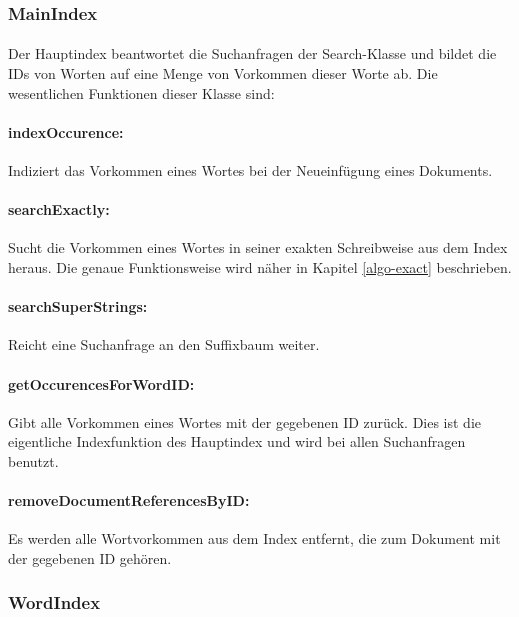 \subsubsection{MainIndex}
\label{arch-mainIndex}

\paragraph{} Der Hauptindex beantwortet die Suchanfragen der Search-Klasse und bildet die IDs von Worten auf eine Menge von Vorkommen dieser Worte ab. Die wesentlichen Funktionen dieser Klasse sind:

\paragraph{indexOccurence:} Indiziert das Vorkommen eines Wortes bei der Neueinfügung eines Dokuments.

\paragraph{searchExactly:} Sucht die Vorkommen eines Wortes in seiner exakten Schreibweise aus dem Index heraus. Die genaue Funktionsweise wird näher in Kapitel \ref{algo-exact} beschrieben.

\paragraph{searchSuperStrings:} Reicht eine Suchanfrage an den Suffixbaum weiter.

\paragraph{getOccurencesForWordID:} Gibt alle Vorkommen eines Wortes mit der gegebenen ID zurück. Dies ist die eigentliche Indexfunktion des Hauptindex und wird bei allen Suchanfragen benutzt.

\paragraph{removeDocumentReferencesByID:} Es werden alle Wortvorkommen aus dem Index entfernt, die zum Dokument mit der gegebenen ID gehören.

\subsubsection{WordIndex}
\label{arch-wordIndex}

